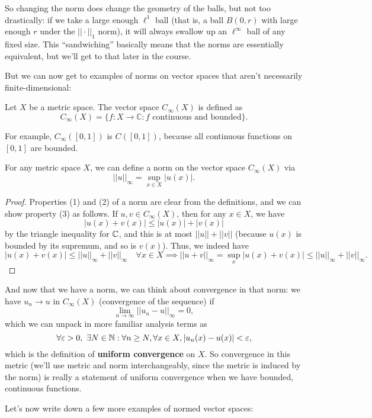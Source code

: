 So changing the norm does change the geometry of the balls, but not too drastically: if we take a large enough $\ell^1$ ball (that is, a ball $B(0, r)$ with large enough $r$ under the $||\cdot||_1$ norm), it will always swallow up an $\ell^\infty$ ball of any fixed size. This ``sandwiching'' basically means that the norms are essentially equivalent, but we'll get to that later in the course. 

But we can now get to examples of norms on vector spaces that aren't necessarily finite-dimensional: 
\begin{definition}
Let $X$ be a metric space. The vector space $C_{\infty}(X)$ is defined as
\[
    C_{\infty}(X) = \{f: X \to \mathbb{C}: f \text{ continuous and bounded}\}. 
\]
\end{definition}
For example, $C_{\infty}([0, 1])$ is $C([0, 1])$, because all continuous functions on $[0, 1]$ are bounded. 

\begin{proposition}
For any metric space $X$, we can define a norm on the vector space $C_{\infty}(X)$ via 
\[
    ||u||_{\infty} = \sup_{x \in X} |u(x)|.
\]
\end{proposition}
\begin{proof}
Properties (1) and (2) of a norm are clear from the definitions, and we can show property (3) as follows. If $u, v \in C_{\infty}(X)$, then for any $x \in X$, we have 
\[
    |u(x) + v(x)| \le |u(x)| + |v(x)|
\]
by the triangle inequality for $\mathbb C$, and this is at most $||u|| + ||v||$ (because $u(x)$ is bounded by its supremum, and so is $v(x)$). Thus, we indeed have 
\[
    |u(x) + v(x)| \le ||u||_\infty + ||v||_\infty \quad \forall x \in X \implies ||u + v||_\infty = \sup_{x} |u(x) + v(x)| \le ||u||_\infty + ||v||_\infty.
\]
\end{proof}

And now that we have a norm, we can think about convergence in that norm: we have $u_n \to u$ in $C_{\infty}(X)$ (convergence of the sequence) if
\[
    \lim_{n \to \infty} ||u_n-u||_{\infty} = 0,
\]
which we can unpack in more familiar analysis terms as 
\[
    \forall \varepsilon > 0, \, \, \exists N \in \mathbb{N}: \forall n \ge N, \forall x \in X, |u_n(x) - u(x)| < \varepsilon,
\]
which is the definition of \textbf{uniform convergence} on $X$. So convergence in this metric (we'll use metric and norm interchangeably, since the metric is induced by the norm) is really a statement of uniform convergence when we have bounded, continuous functions.

Let's now write down a few more examples of normed vector spaces:

